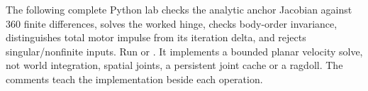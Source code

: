 The following complete Python lab checks the analytic anchor Jacobian against 360 finite differences, solves the worked hinge, checks body-order invariance, distinguishes total motor impulse from its iteration delta, and rejects singular/nonfinite inputs. Run  or . It implements a bounded planar velocity solve, not world integration, spatial joints, a persistent joint cache or a ragdoll. The comments teach the implementation beside each operation.

